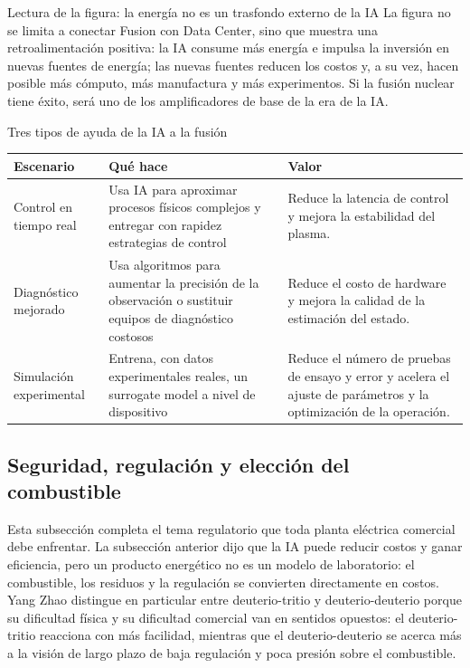 \begin{knowledgebox}{Lectura de la figura: la energía no es un trasfondo externo de la IA}
La figura no se limita a conectar Fusion con Data Center, sino que muestra una retroalimentación positiva: la IA consume más energía e impulsa la inversión en nuevas fuentes de energía; las nuevas fuentes reducen los costos y, a su vez, hacen posible más cómputo, más manufactura y más experimentos. Si la fusión nuclear tiene éxito, será uno de los amplificadores de base de la era de la IA.
\end{knowledgebox}

\begin{knowledgebox}{Tres tipos de ayuda de la IA a la fusión}
\begin{tabularx}{\textwidth}{p{}p{}X}
\toprule
Escenario & Qué hace & Valor \\
\midrule
Control en tiempo real & Usa IA para aproximar procesos físicos complejos y entregar con rapidez estrategias de control & Reduce la latencia de control y mejora la estabilidad del plasma. \\
Diagnóstico mejorado & Usa algoritmos para aumentar la precisión de la observación o sustituir equipos de diagnóstico costosos & Reduce el costo de hardware y mejora la calidad de la estimación del estado. \\
Simulación experimental & Entrena, con datos experimentales reales, un surrogate model a nivel de dispositivo & Reduce el número de pruebas de ensayo y error y acelera el ajuste de parámetros y la optimización de la operación. \\
\bottomrule
\end{tabularx}
\end{knowledgebox}

\subsection{Seguridad, regulación y elección del combustible}

Esta subsección completa el tema regulatorio que toda planta eléctrica comercial debe enfrentar. La subsección anterior dijo que la IA puede reducir costos y ganar eficiencia, pero un producto energético no es un modelo de laboratorio: el combustible, los residuos y la regulación se convierten directamente en costos. Yang Zhao distingue en particular entre deuterio-tritio y deuterio-deuterio porque su dificultad física y su dificultad comercial van en sentidos opuestos: el deuterio-tritio reacciona con más facilidad, mientras que el deuterio-deuterio se acerca más a la visión de largo plazo de baja regulación y poca presión sobre el combustible.

